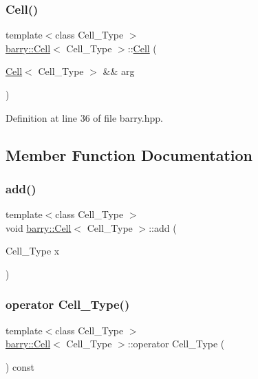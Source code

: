\subsubsection{\texorpdfstring{Cell()}{Cell()}\hspace{0.1cm}{\footnotesize\ttfamily [5/5]}}
{\footnotesize\ttfamily template$<$class Cell\+\_\+\+Type $>$ \\
\hyperlink{classbarry_1_1_cell}{barry\+::\+Cell}$<$ Cell\+\_\+\+Type $>$\+::\hyperlink{classbarry_1_1_cell}{Cell} (\begin{DoxyParamCaption}\item[{\hyperlink{classbarry_1_1_cell}{Cell}$<$ Cell\+\_\+\+Type $>$ \&\&}]{arg }\end{DoxyParamCaption})\hspace{0.3cm}{\ttfamily [inline]}}



Definition at line 36 of file barry.\+hpp.



\subsection{Member Function Documentation}
\mbox{\label{classbarry_1_1_cell_a40c9aad3ba2c9d5a1a91833c66522ad8}} 
\subsubsection{\texorpdfstring{add()}{add()}}
{\footnotesize\ttfamily template$<$class Cell\+\_\+\+Type $>$ \\
void \hyperlink{classbarry_1_1_cell}{barry\+::\+Cell}$<$ Cell\+\_\+\+Type $>$\+::add (\begin{DoxyParamCaption}\item[{Cell\+\_\+\+Type}]{x }\end{DoxyParamCaption})}

\mbox{\label{classbarry_1_1_cell_a90bea0b3306e1780747ca1ef6f389e91}} 
\subsubsection{\texorpdfstring{operator Cell\+\_\+\+Type()}{operator Cell\_Type()}}
{\footnotesize\ttfamily template$<$class Cell\+\_\+\+Type $>$ \\
\hyperlink{classbarry_1_1_cell}{barry\+::\+Cell}$<$ Cell\+\_\+\+Type $>$\+::operator Cell\+\_\+\+Type (\begin{DoxyParamCaption}{ }\end{DoxyParamCaption}) const\hspace{0.3cm}{\ttfamily [inline]}}



